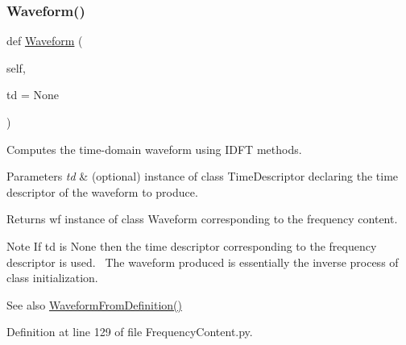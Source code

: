 \subsubsection{\texorpdfstring{Waveform()}{Waveform()}}
{\footnotesize\ttfamily def \hyperlink{classSignalIntegrity_1_1TimeDomain_1_1Waveform_1_1Waveform_1_1Waveform}{Waveform} (\begin{DoxyParamCaption}\item[{}]{self,  }\item[{}]{td = {\ttfamily None} }\end{DoxyParamCaption})}



Computes the time-\/domain waveform using I\+D\+FT methods. 


\begin{DoxyParams}{Parameters}
{\em td} & (optional) instance of class Time\+Descriptor declaring the time descriptor of the waveform to produce. \\
\hline
\end{DoxyParams}
\begin{DoxyReturn}{Returns}
wf instance of class Waveform corresponding to the frequency content. 
\end{DoxyReturn}
\begin{DoxyNote}{Note}
If td is None then the time descriptor corresponding to the frequency descriptor is used.~\newline
 The waveform produced is essentially the inverse process of class initialization.~\newline
 
\end{DoxyNote}
\begin{DoxySeeAlso}{See also}
\hyperlink{classSignalIntegrity_1_1FrequencyDomain_1_1FrequencyContent_1_1FrequencyContent_a8dfcef6517e6699a8b78a2bf9c796230}{Waveform\+From\+Definition()} 
\end{DoxySeeAlso}


Definition at line 129 of file Frequency\+Content.\+py.

\mbox{\label{classSignalIntegrity_1_1FrequencyDomain_1_1FrequencyContent_1_1FrequencyContent_a8dfcef6517e6699a8b78a2bf9c796230}} 
